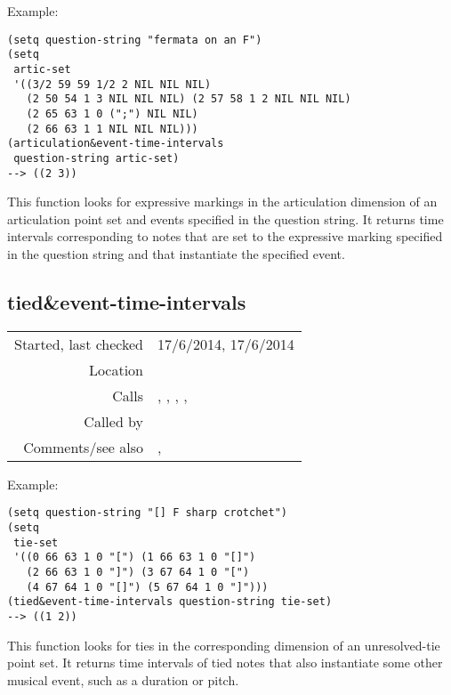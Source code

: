 \vspace{0.5cm}
\noindent Example:
\begin{verbatim}
(setq question-string "fermata on an F")
(setq
 artic-set
 '((3/2 59 59 1/2 2 NIL NIL NIL)
   (2 50 54 1 3 NIL NIL NIL) (2 57 58 1 2 NIL NIL NIL)
   (2 65 63 1 0 (";") NIL NIL)
   (2 66 63 1 1 NIL NIL NIL)))
(articulation&event-time-intervals
 question-string artic-set)
--> ((2 3))
\end{verbatim}

\noindent This function looks for expressive markings
in the articulation dimension of an articulation point
set and events specified in the question string. It
returns time intervals corresponding to notes that are
set to the expressive marking specified in the question
string and that instantiate the specified event.


\subsection*{tied\&event-time-intervals}\label{fun:tied-and-event-time-intervals}

\vspace{0.3cm}
\begin{tabular}{r|p{8cm}}
Started, last checked & 17/6/2014, 17/6/2014 \\
Location & \nameref{sec:pitches-intervals-durations} \\
Calls & \nameref{fun:dataset-restricted-to-m-in-nth}, \nameref{fun:duration-time-intervals}, \nameref{fun:duration-n-pitch-class-time-intervals}, \nameref{fun:pitch-class-time-intervals}, \nameref{fun:replace-all} \\
Called by & \nameref{fun:Stravinsqi-Jun2014} \\
Comments/see also & \nameref{fun:articulation-and-event-time-intervals},\newline \nameref{fun:word-time-intervals}
\end{tabular}

\vspace{0.5cm}
\noindent Example:
\begin{verbatim}
(setq question-string "[] F sharp crotchet")
(setq
 tie-set
 '((0 66 63 1 0 "[") (1 66 63 1 0 "[]")
   (2 66 63 1 0 "]") (3 67 64 1 0 "[")
   (4 67 64 1 0 "[]") (5 67 64 1 0 "]")))
(tied&event-time-intervals question-string tie-set)
--> ((1 2))
\end{verbatim}

\noindent This function looks for ties in the
corresponding dimension of an unresolved-tie point set.
It returns time intervals of tied notes that
also instantiate some other musical event, such as a
duration or pitch.


